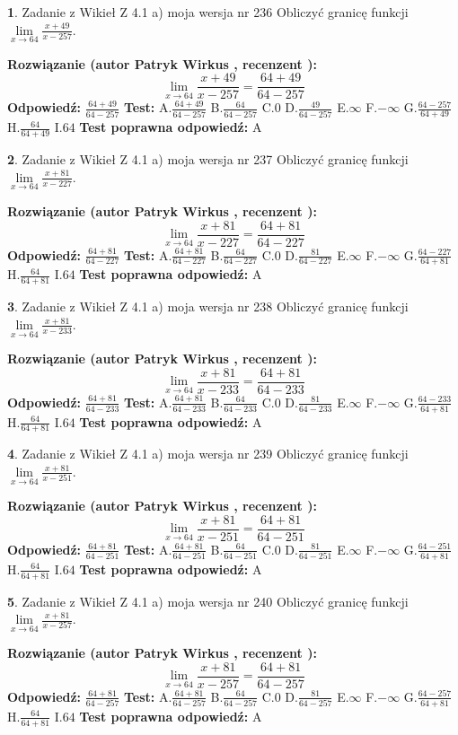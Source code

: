 \documentclass[12pt, a4paper]{article}
\theoremstyle{definition} %
\newtheorem{zad}{}
\newcommand{\zadStart}[1]{\begin{zad}#1\newline}
\newcommand{\zadStop}{\end{zad}}
\newcommand{\rozwStart}[2]{\noindent \textbf{Rozwiązanie (autor #1 , recenzent #2): }\newline}
\newcommand{\rozwStop}{\newline}
\newcommand{\odpStart}{\noindent \textbf{Odpowiedź:}\newline}
\newcommand{\odpStop}{\newline}
\newcommand{\testStart}{\noindent \textbf{Test:}\newline}
\newcommand{\testStop}{\newline}
\newcommand{\kluczStart}{\noindent \textbf{Test poprawna odpowiedź:}\newline}
\newcommand{\kluczStop}{\newline}
\begin{document}
\zadStart{Zadanie z Wikieł Z 4.1 a) moja wersja nr 236}
Obliczyć granicę funkcji $\lim\limits_{x\to64}\frac{x+49}{x-257}$.
\zadStop
\rozwStart{Patryk Wirkus}{}
$$\lim\limits_{x\to64}\frac{x+49}{x-257} = \frac{64+49}{64-257}$$
\rozwStop
\odpStart
$\frac{64+49}{64-257}$
\odpStop
\testStart
A.$\frac{64+49}{64-257}$
B.$\frac{64}{64-257}$
C.$0$
D.$\frac{49}{64-257}$
E.$\infty$
F.$-\infty$
G.$\frac{64-257}{64+49}$
H.$\frac{64}{64+49}$
I.$64$
\testStop
\kluczStart
A
\kluczStop



\zadStart{Zadanie z Wikieł Z 4.1 a) moja wersja nr 237}
Obliczyć granicę funkcji $\lim\limits_{x\to64}\frac{x+81}{x-227}$.
\zadStop
\rozwStart{Patryk Wirkus}{}
$$\lim\limits_{x\to64}\frac{x+81}{x-227} = \frac{64+81}{64-227}$$
\rozwStop
\odpStart
$\frac{64+81}{64-227}$
\odpStop
\testStart
A.$\frac{64+81}{64-227}$
B.$\frac{64}{64-227}$
C.$0$
D.$\frac{81}{64-227}$
E.$\infty$
F.$-\infty$
G.$\frac{64-227}{64+81}$
H.$\frac{64}{64+81}$
I.$64$
\testStop
\kluczStart
A
\kluczStop



\zadStart{Zadanie z Wikieł Z 4.1 a) moja wersja nr 238}
Obliczyć granicę funkcji $\lim\limits_{x\to64}\frac{x+81}{x-233}$.
\zadStop
\rozwStart{Patryk Wirkus}{}
$$\lim\limits_{x\to64}\frac{x+81}{x-233} = \frac{64+81}{64-233}$$
\rozwStop
\odpStart
$\frac{64+81}{64-233}$
\odpStop
\testStart
A.$\frac{64+81}{64-233}$
B.$\frac{64}{64-233}$
C.$0$
D.$\frac{81}{64-233}$
E.$\infty$
F.$-\infty$
G.$\frac{64-233}{64+81}$
H.$\frac{64}{64+81}$
I.$64$
\testStop
\kluczStart
A
\kluczStop



\zadStart{Zadanie z Wikieł Z 4.1 a) moja wersja nr 239}
Obliczyć granicę funkcji $\lim\limits_{x\to64}\frac{x+81}{x-251}$.
\zadStop
\rozwStart{Patryk Wirkus}{}
$$\lim\limits_{x\to64}\frac{x+81}{x-251} = \frac{64+81}{64-251}$$
\rozwStop
\odpStart
$\frac{64+81}{64-251}$
\odpStop
\testStart
A.$\frac{64+81}{64-251}$
B.$\frac{64}{64-251}$
C.$0$
D.$\frac{81}{64-251}$
E.$\infty$
F.$-\infty$
G.$\frac{64-251}{64+81}$
H.$\frac{64}{64+81}$
I.$64$
\testStop
\kluczStart
A
\kluczStop



\zadStart{Zadanie z Wikieł Z 4.1 a) moja wersja nr 240}
Obliczyć granicę funkcji $\lim\limits_{x\to64}\frac{x+81}{x-257}$.
\zadStop
\rozwStart{Patryk Wirkus}{}
$$\lim\limits_{x\to64}\frac{x+81}{x-257} = \frac{64+81}{64-257}$$
\rozwStop
\odpStart
$\frac{64+81}{64-257}$
\odpStop
\testStart
A.$\frac{64+81}{64-257}$
B.$\frac{64}{64-257}$
C.$0$
D.$\frac{81}{64-257}$
E.$\infty$
F.$-\infty$
G.$\frac{64-257}{64+81}$
H.$\frac{64}{64+81}$
I.$64$
\testStop
\kluczStart
A
\kluczStop
\end{document}
